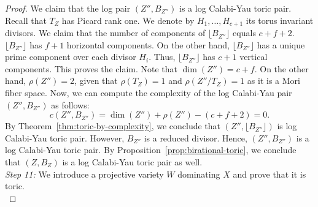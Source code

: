 \documentclass{amsart}
\theoremstyle{remark}
\numberwithin{equation}{section}
\begin{document}
\begin{proof}
We claim that the log pair $(Z'',B_{Z''})$ is a log Calabi-Yau toric pair.
Recall that $T_Z$ has Picard rank one.
We denote by $H_1,\dots,H_{c+1}$ its torus invariant divisors.
We claim that the number of components
of $\lfloor B_{Z''}\rfloor$ equals $c+f+2$.
$\lfloor B_{Z''}\rfloor$ has $f+1$ horizontal components.
On the other hand, 
$\lfloor B_{Z''}\rfloor$ has a unique prime component
over each divisor $H_i$.
Thus, $\lfloor B_{Z''}\rfloor$ has $c+1$ vertical components.
This proves the claim.
Note that $\dim(Z'')=c+f$.
On the other hand, $\rho(Z'')=2$, given that
$\rho(T_Z)=1$ and $\rho(Z''/T_Z)=1$ as it is a Mori fiber space.
Now, we can compute the complexity of the log Calabi-Yau pair $(Z'',B_{Z''})$ as follows:
\[
c(Z'',B_{Z''})=\dim(Z'')+\rho(Z'')-(c+f+2) = 0.
\]
By Theorem~\ref{thm:toric-by-complexity}, we conclude that $(Z'',\lfloor B_{Z''}\rfloor)$ is log Calabi-Yau toric pair.
However, $B_{Z''}$ is a reduced divisor.
Hence, $(Z'',B_{Z''})$ is a log Calabi-Yau toric pair.
By Proposition~\ref{prop:birational-toric}, we conclude that $(Z,B_Z)$ is a log Calabi-Yau toric pair as well.\\

\textit{Step 11:} We introduce a projective variety $W$ dominating $X$ and prove that it is toric.\\



\end{proof}
\end{document}
